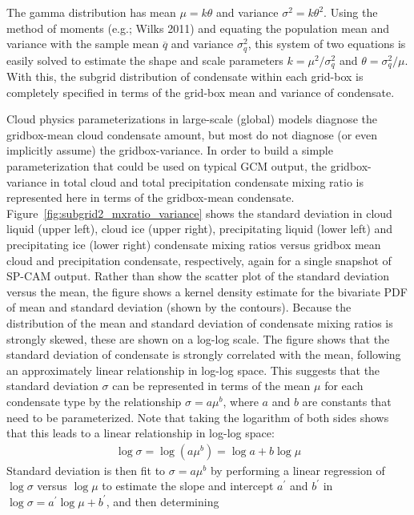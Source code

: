 The gamma distribution has mean \(\mu = k\theta\) and variance
\(\sigma^2 = k \theta^2\). Using the method of moments (e.g.; Wilks
2011) and equating the population mean and variance with the sample mean
\(\overline{q}\) and variance \(\sigma_q^2\), this system of two
equations is easily solved to estimate the shape and scale parameters
\(k = \mu^2 / \sigma_q^2\) and \(\theta = \sigma_q^2 / \mu\). With this,
the subgrid distribution of condensate within each grid-box is
completely specified in terms of the grid-box mean and variance of
condensate.

Cloud physics parameterizations in large-scale (global) models diagnose
the gridbox-mean cloud condensate amount, but most do not diagnose (or
even implicitly assume) the gridbox-variance. In order to build a simple
parameterization that could be used on typical GCM output, the
gridbox-variance in total cloud and total precipitation condensate
mixing ratio is represented here in terms of the gridbox-mean
condensate. Figure~\ref{fig:subgrid2_mxratio_variance} shows the
standard deviation in cloud liquid (upper left), cloud ice (upper
right), precipitating liquid (lower left) and precipitating ice (lower
right) condensate mixing ratios versus gridbox mean cloud and
precipitation condensate, respectively, again for a single snapshot of
SP-CAM output. Rather than show the scatter plot of the standard
deviation versus the mean, the figure shows a kernel density estimate
for the bivariate PDF of mean and standard deviation (shown by the
contours). Because the distribution of the mean and standard deviation
of condensate mixing ratios is strongly skewed, these are shown on a
log-log scale. The figure shows that the standard deviation of
condensate is strongly correlated with the mean, following an
approximately linear relationship in log-log space. This suggests that
the standard deviation \(\sigma\) can be represented in terms of the
mean \(\mu\) for each condensate type by the relationship
\(\sigma = a \mu^b\), where \(a\) and \(b\) are constants that need to
be parameterized. Note that taking the logarithm of both sides shows
that this leads to a linear relationship in log-log space:
\[\begin{gathered}
    \log \sigma = \log(a \mu^b) = \log a + b\log \mu\end{gathered}\]
Standard deviation is then fit to \(\sigma = a \mu^b\) by performing a
linear regression of \(\log\sigma\) versus \(\log \mu\) to estimate the
slope and intercept \(a^{\prime}\) and \(b^{\prime}\) in
\(\log \sigma = a^{\prime} \log \mu + b^{\prime}\), and then determining
